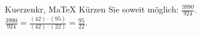 \begin{MAufgabe}{Kuerzen}{kr, MaTeX}
K\"urzen Sie soweit m\"oglich: $\frac{3990}{924}$.\\ 
\ifLsg\MLoesung
\quad $\frac{3990}{924}=\frac{(42)\cdot(95)}{(42)\cdot(22)}=\frac{95}{22}$.\else\relax\fi
 \end{MAufgabe}